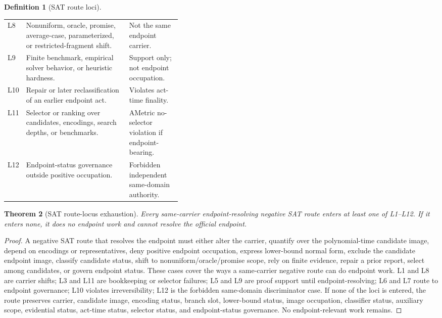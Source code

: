\documentclass[11pt]{article}
\newtheorem{theorem}{Theorem}[section]
\theoremstyle{definition}
\newtheorem{definition}[theorem]{Definition}
\theoremstyle{remark}
\begin{document}
\begin{definition}[SAT route loci]
\begin{center}
\begin{tabularx}{\linewidth}{>{\raggedright\arraybackslash}p{0.10\linewidth}>{\raggedright\arraybackslash}X>{\raggedright\arraybackslash}p{0.30\linewidth}}
L8 & Nonuniform, oracle, promise, average-case, parameterized, or restricted-fragment shift. & Not the same endpoint carrier. \\
L9 & Finite benchmark, empirical solver behavior, or heuristic hardness. & Support only; not endpoint occupation. \\
L10 & Repair or later reclassification of an earlier endpoint act. & Violates act-time finality. \\
L11 & Selector or ranking over candidates, encodings, search depths, or benchmarks. & AMetric no-selector violation if endpoint-bearing. \\
L12 & Endpoint-status governance outside positive occupation. & Forbidden independent same-domain authority. \\
\bottomrule
\end{tabularx}
\end{center}
\end{definition}

\begin{theorem}[SAT route-locus exhaustion]\label{thm:sat-route-locus-exhaustion}
Every same-carrier endpoint-resolving negative SAT route enters at least one of L1--L12. If it enters none, it does no endpoint work and cannot resolve the official endpoint.
\end{theorem}

\begin{proof}
A negative SAT route that resolves the endpoint must either alter the carrier, quantify over the polynomial-time candidate image, depend on encodings or representatives, deny positive endpoint occupation, express lower-bound normal form, exclude the candidate endpoint image, classify candidate status, shift to nonuniform/oracle/promise scope, rely on finite evidence, repair a prior report, select among candidates, or govern endpoint status. These cases cover the ways a same-carrier negative route can do endpoint work. L1 and L8 are carrier shifts; L3 and L11 are bookkeeping or selector failures; L5 and L9 are proof support until endpoint-resolving; L6 and L7 route to endpoint governance; L10 violates irreversibility; L12 is the forbidden same-domain discriminator case. If none of the loci is entered, the route preserves carrier, candidate image, encoding status, branch slot, lower-bound status, image occupation, classifier status, auxiliary scope, evidential status, act-time status, selector status, and endpoint-status governance. No endpoint-relevant work remains.
\end{proof}
\end{document}
